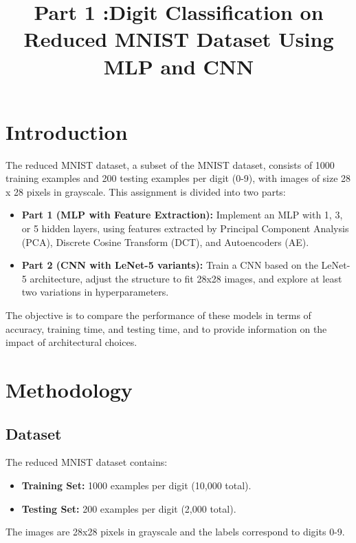 \documentclass[a4paper,12pt]{article}
\title{Part 1 :Digit Classification on Reduced MNIST Dataset Using MLP and CNN}
\begin{document}
\maketitle

\section{Introduction}
The reduced MNIST dataset, a subset of the MNIST dataset, consists of 1000 training examples and 200 testing examples per digit (0-9), with images of size 28 x 28 pixels in grayscale. This assignment is divided into two parts:

\begin{itemize}
    \item \textbf{Part 1 (MLP with Feature Extraction):} Implement an MLP with 1, 3, or 5 hidden layers, using features extracted by Principal Component Analysis (PCA), Discrete Cosine Transform (DCT), and Autoencoders (AE).
    \item \textbf{Part 2 (CNN with LeNet-5 variants):} Train a CNN based on the LeNet-5 architecture, adjust the structure to fit 28x28 images, and explore at least two variations in hyperparameters.
\end{itemize}

The objective is to compare the performance of these models in terms of accuracy, training time, and testing time, and to provide information on the impact of architectural choices.

\section{Methodology}

\subsection{Dataset}
The reduced MNIST dataset contains:
\begin{itemize}
    \item \textbf{Training Set:} 1000 examples per digit (10,000 total).
    \item \textbf{Testing Set:} 200 examples per digit (2,000 total).
\end{itemize}
The images are 28x28 pixels in grayscale and the labels correspond to digits 0-9.
\end{document}
